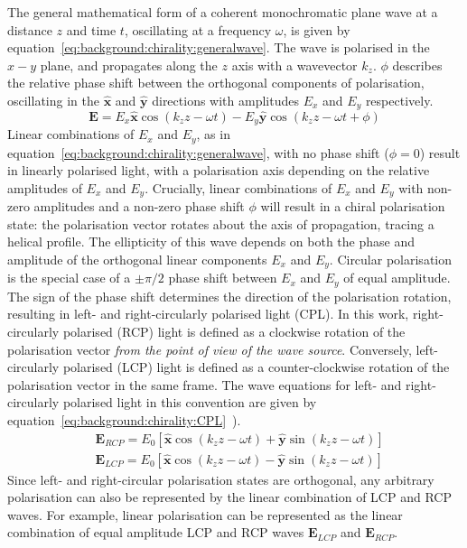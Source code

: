 The general mathematical form of a coherent monochromatic plane wave at a distance $z$ and time $t$, oscillating at a frequency $\omega$, is given by equation~\ref{eq:background:chirality:generalwave}. The wave is polarised in the $x-y$ plane, and propagates along the $z$ axis with a wavevector $k_z$. $\phi$ describes the relative phase shift between the orthogonal components of polarisation, oscillating in the $\mathbf{\hat{x}}$ and $\mathbf{\hat{y}}$ directions with amplitudes $E_x$ and $E_y$ respectively.
\begin{equation} \label{eq:background:chirality:generalwave}
    \mathbf{E}= E_x  \mathbf{\hat{x}} \cos(k_z z-\omega t) - E_y \mathbf{\hat{y}} \cos(k_z z-\omega t +\phi)
\end{equation}
Linear combinations of $E_x$ and $E_y$, as in equation~\ref{eq:background:chirality:generalwave}, with no phase shift ($\phi=0$) result in linearly polarised light, with a polarisation axis depending on the relative amplitudes of $E_x$ and $E_y$. Crucially, linear combinations of $E_x$ and $E_y$ with non-zero amplitudes and a non-zero phase shift $\phi$ will result in a chiral polarisation state: the polarisation vector rotates about the axis of propagation, tracing a helical profile. The ellipticity of this wave depends on both the phase and amplitude of the orthogonal linear components $E_x$ and $E_y$. Circular polarisation is the special case of a $\pm \pi/2$ phase shift between $E_x$ and $E_y$ of equal amplitude. The sign of the phase shift determines the direction of the polarisation rotation, resulting in left- and right-circularly polarised light (CPL). In this work, right-circularly polarised (RCP) light is defined as a clockwise rotation of the polarisation vector \textit{from the point of view of the wave source}. Conversely, left-circularly polarised (LCP) light is defined as a counter-clockwise rotation of the polarisation vector in the same frame. The wave equations for left- and right-circularly polarised light in this convention are given by equation~\ref{eq:background:chirality:CPL}~\cite[\S 8.1.2]{Hecht2013}). 
\begin{equation} \label{eq:background:chirality:CPL}
    \begin{split}
        & \mathbf{E}_{RCP} = E_0 \left[ \mathbf{\hat{x}} \cos(k_z z-\omega t) + \mathbf{\hat{y}} \sin(k_z z-\omega t )\right]\\
        & \mathbf{E}_{LCP}= E_0 \left[ \mathbf{\hat{x}} \cos(k_z z-\omega t) - \mathbf{\hat{y}} \sin(k_z z-\omega t )\right]
    \end{split}
\end{equation}
Since left- and right-circular polarisation states are orthogonal, any arbitrary polarisation can also be represented by the linear combination of LCP and RCP waves. For example, linear polarisation can be represented as the linear combination of equal amplitude LCP and RCP waves $\mathbf{E}_{LCP}$ and $\mathbf{E}_{RCP}$. 

